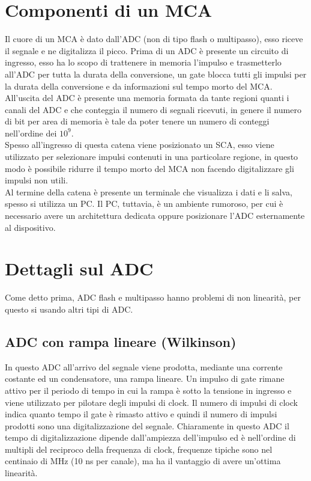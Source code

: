 \section{Componenti di un MCA}
Il cuore di un MCA \`e dato dall'ADC (non di tipo flash o multipasso), esso riceve il segnale e ne digitalizza il picco.
Prima di un ADC \`e presente un circuito di ingresso, esso ha lo scopo di trattenere in memoria l'impulso e trasmetterlo all'ADC per tutta la durata della conversione,
un gate blocca tutti gli impulsi per la durata della conversione e da informazioni sul tempo morto del MCA.
All'uscita del ADC \`e presente una memoria formata da tante regioni quanti i canali del ADC e che conteggia il numero di segnali ricevuti, in genere
il numero di bit per area di memoria \`e tale da poter tenere un numero di conteggi nell'ordine dei $10^9$.\\
Spesso all'ingresso di questa catena viene posizionato un SCA, esso viene utilizzato per selezionare impulsi contenuti in una particolare regione,
in questo modo \`e possibile ridurre il tempo morto del MCA non facendo digitalizzare gli impulsi non utili.\\
Al termine della catena \`e presente un terminale che visualizza i dati e li salva, spesso si utilizza un PC. 
Il PC, tuttavia, \`e un ambiente rumoroso, per cui \`e necessario avere un architettura dedicata oppure posizionare l'ADC esternamente al dispositivo.
\section{Dettagli sul ADC}
Come detto prima, ADC flash e multipasso hanno problemi di non linearit\`a, per questo si usando altri tipi di ADC.
\subsection{ADC con rampa lineare (Wilkinson)}
In questo ADC all'arrivo del segnale viene prodotta, mediante una corrente costante ed un condensatore, una rampa lineare.
Un impulso di gate rimane attivo per il periodo di tempo in cui la rampa \`e sotto la tensione in ingresso e viene utilizzato
per pilotare degli impulsi di clock.
Il numero di impulsi di clock indica quanto tempo il gate \`e rimasto attivo e quindi il numero di impulsi prodotti sono una digitalizzazione
del segnale.
Chiaramente in questo ADC il tempo di digitalizzazione dipende dall'ampiezza dell'impulso ed \`e nell'ordine di multipli del reciproco della frequenza di clock,
frequenze tipiche sono nel centinaio di MHz (10 ns per canale), ma ha il vantaggio di avere un'ottima linearit\`a.
